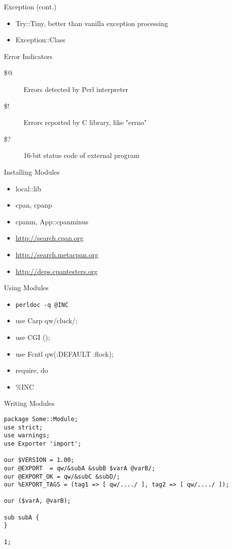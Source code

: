\documentclass{beamer}
\begin{document}
\begin{frame}[containsverbatim]{Exception (cont.)}
  \begin{itemize}
    \item Try::Tiny, better than vanilla exception processing
    \item Exception::Class
  \end{itemize}
\end{frame}

\begin{frame}[containsverbatim]{Error Indicators}
  \begin{description}
    \item[\$@] Errors detected by Perl interpreter
    \item[\$!] Errors reported by C library, like "errno"
    \item[\$?] 16-bit status code of external program
  \end{description}
\end{frame}

\begin{frame}[containsverbatim]{Installing Modules}
  \begin{itemize}
    \item local::lib
    \item cpan, cpanp
    \item cpanm, App::cpanminus
    \item \url{http://search.cpan.org}
    \item \url{http://search.metacpan.org}
    \item \url{http://deps.cpantesters.org}
  \end{itemize}
\end{frame}

\begin{frame}[containsverbatim]{Using Modules}
  \begin{itemize}
    \item \texttt{perldoc -q @INC}
    \item use Carp qw/cluck/;
    \item use CGI ();
    \item use Fcntl qw(:DEFAULT :flock);
    \item require, do
    \item \%INC
  \end{itemize}
\end{frame}

\begin{frame}[containsverbatim]{Writing Modules}
\begin{lstlisting}[caption=Some/Module.pm]
package Some::Module;
use strict;
use warnings;
use Exporter 'import';

our $VERSION = 1.00;
our @EXPORT  = qw/&subA &subB $varA @varB/;
our @EXPORT_OK = qw/&subC &subD/;
our %EXPORT_TAGS = (tag1 => [ qw/..../ ], tag2 => [ qw/..../ ]);

our ($varA, @varB);

sub subA {
}

1;
\end{lstlisting}
\end{frame}
\end{document}

